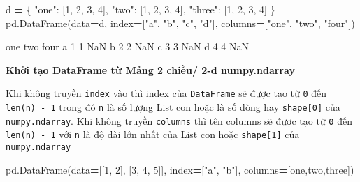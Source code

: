 \documentclass[
]{book}
\newenvironment{Shaded}{\begin{snugshade}}{\end{snugshade}}
\newcommand{\DecValTok}[1]{\textcolor[rgb]{0.00,0.00,0.81}{#1}}
\newcommand{\NormalTok}[1]{#1}
\newcommand{\OperatorTok}[1]{\textcolor[rgb]{0.81,0.36,0.00}{\textbf{#1}}}
\newcommand{\StringTok}[1]{\textcolor[rgb]{0.31,0.60,0.02}{#1}}
\begin{document}
\begin{Shaded}
\begin{Highlighting}[]
\NormalTok{d }\OperatorTok{=}\NormalTok{ \{}
            \StringTok{"one"}\NormalTok{: [}\DecValTok{1}\NormalTok{, }\DecValTok{2}\NormalTok{, }\DecValTok{3}\NormalTok{, }\DecValTok{4}\NormalTok{],}
            \StringTok{"two"}\NormalTok{: [}\DecValTok{1}\NormalTok{, }\DecValTok{2}\NormalTok{, }\DecValTok{3}\NormalTok{, }\DecValTok{4}\NormalTok{],}
            \StringTok{"three"}\NormalTok{: [}\DecValTok{1}\NormalTok{, }\DecValTok{2}\NormalTok{, }\DecValTok{3}\NormalTok{, }\DecValTok{4}\NormalTok{]}
\NormalTok{        \}}
\NormalTok{pd.DataFrame(data}\OperatorTok{=}\NormalTok{d,}
\NormalTok{                     index}\OperatorTok{=}\NormalTok{[}\StringTok{"a"}\NormalTok{, }\StringTok{"b"}\NormalTok{, }\StringTok{"c"}\NormalTok{, }\StringTok{"d"}\NormalTok{],}
\NormalTok{                     columns}\OperatorTok{=}\NormalTok{[}\StringTok{"one"}\NormalTok{, }\StringTok{"two"}\NormalTok{, }\StringTok{"four"}\NormalTok{])}
\end{Highlighting}
\end{Shaded}

\begin{Shaded}
\begin{Highlighting}[]
\NormalTok{   one  two four}
\NormalTok{a    1    1   NaN}
\NormalTok{b    2    2   NaN}
\NormalTok{c    3    3   NaN}
\NormalTok{d    4    4   NaN}
\end{Highlighting}
\end{Shaded}

\textbf{Khởi tạo DataFrame từ Mảng 2 chiều/ 2-d numpy.ndarray}

Khi không truyền \texttt{index} vào thì index của \texttt{DataFrame} sẽ được tạo từ \texttt{0} đến \texttt{len(n)\ -\ 1} trong đó \texttt{n}
là số lượng List con hoặc là số dòng hay \texttt{shape{[}0{]}} của \texttt{numpy.ndarray}. Khi không truyền \texttt{columns}
thì tên columns sẽ được tạo từ \texttt{0} đến \texttt{len(n)\ -\ 1} với \texttt{n} là độ dài lớn nhất của List con hoặc \texttt{shape{[}1{]}}
của \texttt{numpy.ndarray}

\begin{Shaded}
\begin{Highlighting}[]
\NormalTok{pd.DataFrame(data}\OperatorTok{=}\NormalTok{[[}\DecValTok{1}\NormalTok{, }\DecValTok{2}\NormalTok{], [}\DecValTok{3}\NormalTok{, }\DecValTok{4}\NormalTok{, }\DecValTok{5}\NormalTok{]], }
\NormalTok{                     index}\OperatorTok{=}\NormalTok{[}\StringTok{"a"}\NormalTok{, }\StringTok{"b"}\NormalTok{], }
\NormalTok{                     columns}\OperatorTok{=}\NormalTok{[}\StringTok{\textquotesingle{}one\textquotesingle{}}\NormalTok{,}\StringTok{\textquotesingle{}two\textquotesingle{}}\NormalTok{,}\StringTok{\textquotesingle{}three\textquotesingle{}}\NormalTok{])}
\end{Highlighting}
\end{Shaded}
\end{document}
